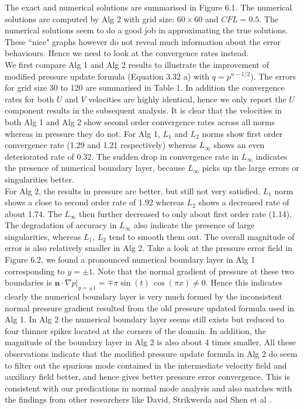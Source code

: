 The exact and numerical solutions are summarised in Figure 6.1. The numerical solutions are computed by Alg 2 with grid size: $60 \times 60$ and $CFL = 0.5$. The numerical solutions seem to do a good job in approximating the true solutions. These ``nice" graphs however do not reveal much information about the error behaviours. Hence we need to look at the convergence rates instead.\\

We first compare Alg 1 and Alg 2 results to illustrate the improvement of modified pressure update formula (Equation 3.32 a) with $q = p^{n-1/2}$). The errors for grid size 30 to 120 are summarised in Table 1. In addition the convergence rates for both $U$ and $V$ velocities are highly identical, hence we only report the $U$ component results in the subsequent analysis. It is clear that the velocities in both Alg 1 and Alg 2 show second order convergence rates across all norms whereas in pressure they do not. For Alg 1, $L_1$ and $L_2$ norms show first order convergence rate (1.29 and 1.21 respectively) whereas $L_\infty$ shows an even deteriorated rate of 0.32. The sudden drop in convergence rate in $L_\infty$ indicates the presence of numerical boundary layer, because $L_\infty$ picks up the large errors or singularities better. \\
   For Alg 2, the results in pressure are better, but still not very satisfied. $L_1$ norm shows a close to second order rate of 1.92 whereas $L_2$ shows a decreased rate of about 1.74. The $L_\infty$ then further decreased to only about first order rate (1.14). The degradation of accuracy in $L_\infty$ also indicate the presence of large singularities, whereas $L_1,\,L_2$ tend to smooth them out. The overall magnitude of error is also relatively smaller in Alg 2. Take a look at the pressure error field in Figure 6.2, we found a pronounced numerical boundary layer in Alg 1 corresponding to $y = \pm 1$. Note that the normal gradient of pressure at these two boundaries is $\textbf{n}\cdot \nabla p |_{y = \pm 1} = \mp \pi \sin(t)\,\cos(\pi x) \neq 0$. Hence this indicates clearly the numerical boundary layer is very much formed by the inconsistent normal pressure gradient resulted from the old pressure updated formula used in Alg 1. In Alg 2 the numerical boundary layer seems still exists but reduced to four thinner spikes located at the corners of the domain. In addition, the magnitude of the boundary layer in Alg 2 is also about 4 times smaller. All these observations indicate that the modified pressure update formula in Alg 2 do seem to filter out the spurious mode contained in the intermediate velocity field and auxiliary field better, and hence gives better pressure error convergence. This is consistent with our predications in normal mode analysis and also matches with the findings from other researchers like David, Strikwerda and Shen et al \cite{brown2001accurate, strikwerda1999accuracy, guermond2006overview, guermond2004error}.\\

